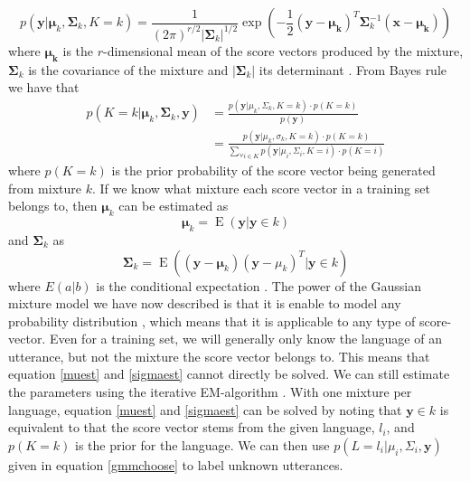 \begin{equation}
\label{gmmeq}
p(\mathbf{y} | \mathbf{\mu}_k, \mathbf{\Sigma}_k, K = k) = \frac{1}{(2\pi)^{r/2}|\mathbf{\Sigma}_k|^{1/2}}\exp(-\frac{1}{2}(\mathbf{y}-\mathbf{\mu_k})^T\mathbf{\Sigma}_k^{-1}(\mathbf{x}-\mathbf{\mu_k}))
\end{equation}
where $\mathbf{\mu_k}$ is the $r$-dimensional mean of the score vectors produced by the mixture, $\mathbf{\Sigma}_k$ is the covariance of the mixture and $|\mathbf{\Sigma}_k|$ its determinant \cite[p. 94]{talegk}. From Bayes rule we have that
\begin{align}
p(K=k | \mathbf{\mu}_k, \mathbf{\Sigma}_k, \mathbf{y}) &= 
\frac{p(\mathbf{y} | \mu_k, \Sigma_k, K= k) \cdot p(K=k )}{p(\mathbf{y})} \nonumber \\
&= \frac{p(\mathbf{y} | \mu_k, \sigma_k, K=k) \cdot p(K=k)}{\sum_{\forall i \in K} p(\mathbf{y} | \mu_i, \Sigma_i, K=i) \cdot p(K=i)} \label{gmmchoose}
\end{align}
where $p(K=k)$ is the prior probability of the score vector being generated from mixture $k$. If we know what mixture each score vector in a training set belongs to, then $\mathbf{\mu}_k$ can be estimated as
\begin{equation}
\label{muest}
\mathbf{\mu}_k = \operatorname{E}(\mathbf{y} | \mathbf{y} \in k)
\end{equation}
and $\mathbf{\Sigma}_k$ as
\begin{equation}
\label{sigmaest}
\mathbf{\Sigma}_k = \operatorname{E}\left( (\mathbf{y}-\mathbf{\mu}_k)(\mathbf{y}-\mu_k)^T | \mathbf{y} \in k \right)
\end{equation}
where $E(a|b)$ is the conditional expectation \cite[p. 94]{talegk}. The power of the Gaussian mixture model we have now described is that it is enable to model any probability distribution \cite[p. 95]{talegk}, which means that it is applicable to any type of score-vector. Even for a training set, we will generally only know the language of an utterance, but not the mixture the score vector belongs to. This means that equation \ref{muest} and \ref{sigmaest} cannot directly be solved. We can still estimate the parameters using the iterative EM-algorithm \cite[p. 439]{machinelearningbook}. With one mixture per language, equation \ref{muest} and \ref{sigmaest} can be solved by noting that $\mathbf{y} \in k$ is equivalent to that the score vector stems from the given language, $l_i$, and $p(K=k)$ is the prior for the language. We can then use $p(L=l_i | \mu_i, \Sigma_i, \mathbf{y})$ given in equation \ref{gmmchoose} to label unknown utterances.

